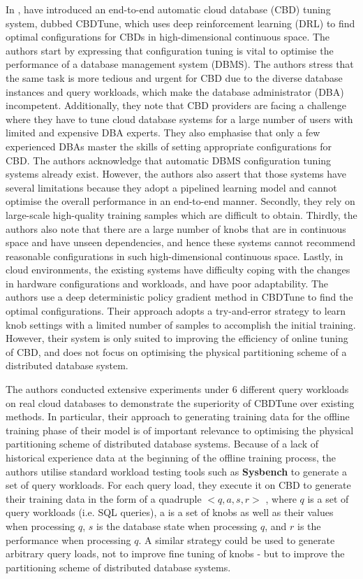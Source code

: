 In \cite{DBLP:conf/sigmod/ZhangLZLXCXWCLR19}, \citeauthor{DBLP:conf/sigmod/ZhangLZLXCXWCLR19} have introduced an end-to-end automatic cloud database (CBD) tuning system, dubbed CBDTune, which uses deep reinforcement learning (DRL) to find optimal configurations for CBDs in high-dimensional continuous space. The authors start by expressing that configuration tuning is vital to optimise the performance of a database management system (DBMS). The authors stress that the same task is more tedious and urgent for CBD due to the diverse database instances and query workloads, which make the database administrator (DBA) incompetent. Additionally, they note that CBD providers are facing a challenge where they have to tune cloud database systems for a large number of users with limited and expensive DBA experts. They also emphasise that only a few experienced DBAs master the skills of setting appropriate configurations for CBD. The authors acknowledge that automatic DBMS configuration tuning systems already exist. However, the authors also assert that those systems have several limitations because they adopt a pipelined learning model and cannot optimise the overall performance in an end-to-end manner. Secondly, they rely on large-scale high-quality training samples which are difficult to obtain. Thirdly, the authors also note that there are a large number of knobs that are in continuous space and have unseen dependencies, and hence these systems cannot recommend reasonable configurations in such high-dimensional continuous space. Lastly, in cloud environments, the existing systems have difficulty coping with the changes in hardware configurations and workloads, and have poor adaptability. 
The authors use a deep deterministic policy gradient method in CBDTune to find the optimal configurations. Their approach adopts a try-and-error strategy to learn knob settings with a limited number of samples to accomplish the initial training. However, their system is only suited to improving the efficiency of online tuning of CBD, and does not focus on optimising the physical partitioning scheme of a distributed database system. 

The authors conducted extensive experiments under 6 different query workloads on real cloud databases to demonstrate the superiority of CBDTune over existing methods. In particular, their approach to generating training data for the offline training phase of their model is of important relevance to optimising the physical partitioning scheme of distributed database systems. Because of a lack of historical experience data at the beginning of the offline training process, the authors utilise standard workload testing tools such as \textbf{Sysbench} to generate a set of query workloads. For each query load, they execute it on CBD to generate their training data in the form of a quadruple $<q, a, s, r>$ , where $q$ is a set of query workloads (i.e. SQL queries), a is a set of knobs as well as their values when processing $q$, $s$ is the database state when processing $q$, and $r$ is the performance when processing $q$. A similar strategy could be used to generate arbitrary query loads, not to improve fine tuning of knobs - but to improve the partitioning scheme of distributed database systems.

